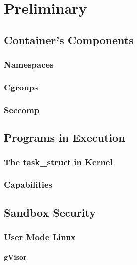 \chapter{Preliminary}

\section{Container's Components}
\subsection{Namespaces}
\subsection{Cgroups}
\subsection{Seccomp}

\section{Programs in Execution}
\subsection{The task\_struct in Kernel}
\subsection{Capabilities}
\label{Capabilities}

\section{Sandbox Security}
\subsection{User Mode Linux}


\subsubsection{gVisor}


